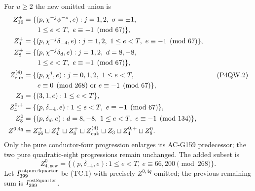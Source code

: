 For $u\geq2$ the new omitted union is
\[
 \begin{aligned}
 Z_{16}^+&=\{(p,\chi^{-j}\phi^{-\sigma},e):j=1,2,\ \sigma=\pm1,\\
 &\hspace{2em}1\leq e<T,\ e\equiv-1\pmod{67}\},\\
 Z_4^+&=\{(p,\chi^{-j}\delta_{-4},e):j=1,2,\ 1\leq e<T,
                                      \ e\equiv-1\pmod{67}\},\\
 Z_8^+&=\{(p,\chi^{-j}\delta_d,e):j=1,2,\ d=8,-8,\\
 &\hspace{2em}1\leq e<T,\ e\equiv-1\pmod{67}\},\\
 Z_{\rm cub}^{(4)}&=\{(p,\chi^j,e):j=0,1,2,\ 1\leq e<T,\\
 &\hspace{2em}e\equiv0\pmod{268}\ \text{or}\ e\equiv-1\pmod{67}\},\\
 Z_3&=\{(3,1,e):1\leq e<T\},\\
 Z_{4}^{0,+}&=\{(p,\delta_{-4},e):1\leq e<T,
                                      \ e\equiv-1\pmod{67}\},\\
 Z_{8}^{0}&=\{(p,\delta_d,e):d=8,-8,\ 1\leq e<T,
                                      \ e\equiv-1\pmod{134}\},\\
 Z^{0,4q}&=Z_{16}^+\sqcup Z_4^+\sqcup Z_8^+
         \sqcup Z_{\rm cub}^{(4)}\sqcup Z_3\sqcup Z_4^{0,+}\sqcup Z_8^0.
 \end{aligned}
 \tag{P4QW.2}
\]
Only the pure conductor-four progression enlarges its AC-G159
predecessor; the two pure quadratic-eight progressions remain unchanged.
The added subset is
\[
 Z_{4,\mathrm{new}}^0=
 \{(p,\delta_{-4},e):1\leq e<T,
                                  \ e\equiv66,200\pmod{268}\}.
 \tag{P4QW.3}
\]
Let $I_{399}^{\rm estpure4quarter}$ be (TC.1) with precisely
$Z^{0,4q}$ omitted; the previous remaining sum is
$I_{399}^{\rm est8quarter}$.

